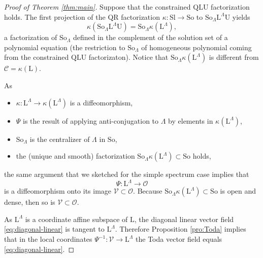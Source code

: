 \documentclass[10pt,a4paper]{amsart}
\renewcommand{\L}{\mathrm{L}}
\newcommand{\Sl}{\mathrm{Sl}}
\newcommand{\So}{\mathrm{So}}
\newcommand{\U}{\mathrm{U}}
\newcommand{\cC}{\mathcal{C}}
\newcommand{\cO}{\mathcal{O}}
\begin{document}
\begin{proof}[Proof of Theorem \ref{thm:main}]
Suppose that the constrained $\mathrm{Q}\L\U$ factorization holds. The first projection of the $\mathrm{QR}$ factorization  $\kappa:\Sl\to  \So$ to $\So_\Lambda\L^\Lambda\U$ yields
 \[\kappa(\So_\Lambda\L^\Lambda\U)=\So_\Lambda \kappa(\L^\Lambda),\]
a factorization of $\So_\Lambda$ defined  in  the complement of the solution set of a polynomial equation (the restriction to $\So_\Lambda$ of homogeneous polynomial coming from the constrained $\mathrm{Q}\L\U$ factorizaton). Notice that   $\So_\Lambda \kappa(\L^\Lambda)$ is different from  $\cC=\kappa(\L)$.

As
\begin{itemize}\item $\kappa:\L^\Lambda\to\kappa(\L^\Lambda)$ is a diffeomorphism,   \item $\Psi$ is the result of applying anti-conjugation to $\Lambda$ by elements in $\kappa(\L^\Lambda)$,\item   $\So_\Lambda$ is the centralizer of $\Lambda$ in $\So$,
 \item
 the (unique and smooth) factorization $\So_\Lambda \kappa(\L^\Lambda)\subset \So$ holds,
 \end{itemize}
 the same argument that we sketched for the simple spectrum case implies
that
\[\Psi:\L^\Lambda\longrightarrow\cO\]
is a diffeomorphism onto its image $\mathcal{V}\subset \cO$. Because $\So_\Lambda\kappa(\L^\Lambda)\subset \So$ is open and dense, then so is $\mathcal{V}\subset \cO$.

As $\L^\Lambda$ is a coordinate affine subspace of $\L$, the diagonal linear vector field  \eqref{eq:diagonal-linear} is tangent to
        $\L^\Lambda$. Therefore
Proposition \ref{pro:Toda} implies that in the local coordinates $\Psi^{-1}:\mathcal{V}\to \L^\Lambda$  the Toda vector field equals \eqref{eq:diagonal-linear}.



\end{proof}
\end{document}
